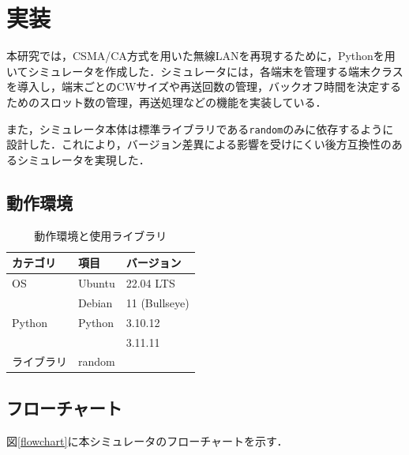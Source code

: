 \documentclass[a4paper,10pt]{ltjsarticle}
\begin{document}
\clearpage
\section{実装}

本研究では，CSMA/CA方式を用いた無線LANを再現するために，Pythonを用いてシミュレータを作成した．シミュレータには，各端末を管理する端末クラスを導入し，端末ごとのCWサイズや再送回数の管理，バックオフ時間を決定するためのスロット数の管理，再送処理などの機能を実装している．

また，シミュレータ本体は標準ライブラリである\texttt{random}のみに依存するように設計した．これにより，バージョン差異による影響を受けにくい後方互換性のあるシミュレータを実現した．


\subsection{動作環境}

\begin{table}[h]
  \centering
  \caption{動作環境と使用ライブラリ}
  \label{tab:env}
  \begin{tabular}{lll}
      \hline
      \textbf{カテゴリ} & \textbf{項目} & \textbf{バージョン} \\ \hline
      OS               & Ubuntu        & 22.04 LTS \\ 
                       & Debian        & 11 (Bullseye) \\ \hline
      Python           & Python        & 3.10.12 \\ 
                        &               & 3.11.11 \\ \hline
      ライブラリ       & random         & \\ \hline
  \end{tabular}
\end{table}



\subsection{フローチャート}
図\ref{flowchart}に本シミュレータのフローチャートを示す．
\end{document}
